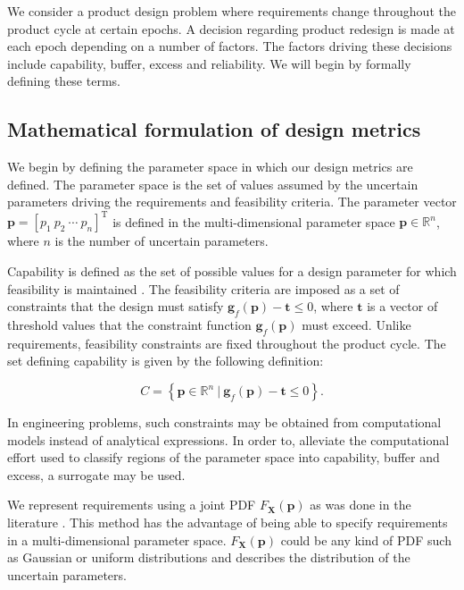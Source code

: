 We consider a product design problem where requirements change throughout the product cycle at certain epochs. A decision regarding product redesign is made at each epoch depending on a number of factors. The factors driving these decisions include capability, buffer, excess and reliability. We will begin by formally defining these terms.

\subsection{Mathematical formulation of design metrics} \label{subsec:designmetrics}

We begin by defining the parameter space in which our design metrics are defined. The parameter space is the set of values assumed by the uncertain parameters driving the requirements and feasibility criteria. The parameter vector $\mathbf{p} = \left[p_1 ~ p_2 ~ \cdots ~ p_n\right]^{\mathrm{T}}$ is defined in the multi-dimensional parameter space $\mathbf{p}\in\mathbb{R}^n$, where $n$ is the number of uncertain parameters.

Capability is defined as the set of possible values for a design parameter for which feasibility is maintained \cite{Eckert2019}. The feasibility criteria are imposed as a set of constraints that the design must satisfy $\mathbf{g}_{f}(\mathbf{p}) - \mathbf{t} \le 0$, where $\mathbf{t}$ is a vector of threshold values that the constraint function $\mathbf{g}_{f}(\mathbf{p})$ must exceed. Unlike requirements, feasibility constraints are fixed throughout the product cycle. The set defining capability is given by the following definition:

\begin{equation} \label{eq:capability}
	\textit{C} = \left\{\mathbf{p} \in \mathbb{R}^n~|~\mathbf{g}_{f}(\mathbf{p}) - \mathbf{t} \le 0\right\}.
\end{equation}

In engineering problems, such constraints may be obtained from computational models instead of analytical expressions. In order to, alleviate the computational effort used to classify regions of the parameter space into capability, buffer and excess, a surrogate may be used.

We represent requirements using a joint \ac{PDF} $F_{\mathbf{X}}\left(\mathbf{p}\right)$ as was done in the literature \cite{Villanueva2014}. This method has the advantage of being able to specify requirements in a multi-dimensional parameter space. $F_{\mathbf{X}}\left(\mathbf{p}\right)$ could be any kind of \ac{PDF} such as Gaussian or uniform distributions and describes the distribution of the uncertain parameters.

